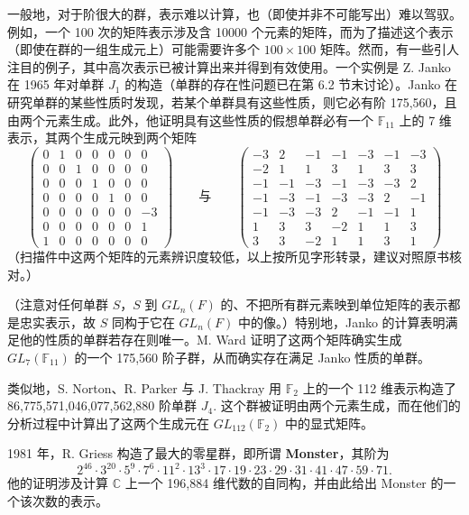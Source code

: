一般地，对于阶很大的群，表示难以计算，也（即使并非不可能写出）难以驾驭。例如，一个 100 次的矩阵表示涉及含 10000 个元素的矩阵，而为了描述这个表示（即使在群的一组生成元上）可能需要许多个 \(100 \times 100\) 矩阵。然而，有一些引人注目的例子，其中高次表示已被计算出来并得到有效使用。一个实例是 Z. Janko 在 1965 年对单群 \(J_1\) 的构造（单群的存在性问题已在第 6.2 节末讨论）。Janko 在研究单群的某些性质时发现，若某个单群具有这些性质，则它必有阶 175,560，且由两个元素生成。此外，他证明具有这些性质的假想单群必有一个 \(\mathbb{F}_{11}\) 上的 7 维表示，其两个生成元映到两个矩阵
\[
\begin{pmatrix}
0&1&0&0&0&0&0\\
0&0&1&0&0&0&0\\
0&0&0&1&0&0&0\\
0&0&0&0&1&0&0\\
0&0&0&0&0&0&-3\\
0&0&0&0&0&0&1\\
1&0&0&0&0&0&0
\end{pmatrix}
\qquad\text{与}\qquad
\begin{pmatrix}
-3&2&-1&-1&-3&-1&-3\\
-2&1&1&3&1&3&3\\
-1&-1&-3&-1&-3&-3&2\\
-1&-3&-1&-3&-3&2&-1\\
-1&-3&-3&2&-1&-1&1\\
1&3&3&-2&1&1&3\\
3&3&-2&1&1&3&1
\end{pmatrix}
\]
（扫描件中这两个矩阵的元素辨识度较低，以上按所见字形转录，建议对照原书核对。）

（注意对任何单群 \(S\)，\(S\) 到 \(GL_n(F)\) 的、不把所有群元素映到单位矩阵的表示都是忠实表示，故 \(S\) 同构于它在 \(GL_n(F)\) 中的像。）特别地，Janko 的计算表明满足他的性质的单群若存在则唯一。M. Ward 证明了这两个矩阵确实生成 \(GL_7(\mathbb{F}_{11})\) 的一个 175,560 阶子群，从而确实存在满足 Janko 性质的单群。

类似地，S. Norton、R. Parker 与 J. Thackray 用 \(\mathbb{F}_2\) 上的一个 112 维表示构造了 86,775,571,046,077,562,880 阶单群 \(J_4\). 这个群被证明由两个元素生成，而在他们的分析过程中计算出了这两个生成元在 \(GL_{112}(\mathbb{F}_2)\) 中的显式矩阵。

1981 年，R. Griess 构造了最大的零星群，即所谓 \textbf{Monster}，其阶为
\[
2^{46}\cdot 3^{20}\cdot 5^9\cdot 7^6\cdot 11^2\cdot 13^3\cdot 17\cdot 19\cdot 23\cdot 29\cdot 31\cdot 41\cdot 47\cdot 59\cdot 71.
\]
他的证明涉及计算 \(\mathbb{C}\) 上一个 196,884 维代数的自同构，并由此给出 Monster 的一个该次数的表示。

